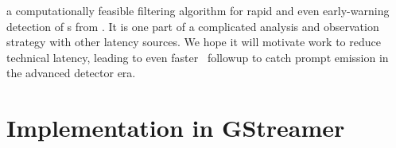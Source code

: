 \documentclass[portrait,plainboxedsections]{sciposter}
\begin{document}
\begin{minipage}[t]{0.4\textwidth}
 a computationally feasible filtering algorithm
for rapid and even early-warning detection of \GW{}s from \CBC.  It is one part
of a complicated analysis and observation strategy with
other latency sources. We hope it will motivate
work to reduce technical latency,
leading to even faster \EM\ followup
to catch prompt emission in the advanced detector era.

\end{minipage}%
\hspace{0.05\textwidth}%
\begin{minipage}[t]{0.25\textwidth}

\section*{Implementation in GStreamer}


\end{minipage}
\end{document}
